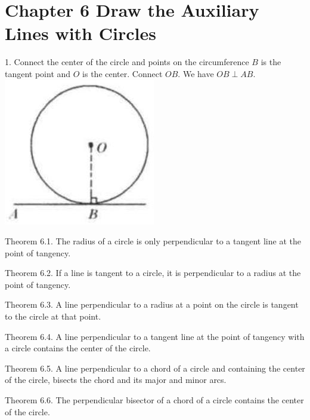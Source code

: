 \documentclass{article}
\begin{document}
\section*{Chapter 6 Draw the Auxiliary Lines with Circles}
1. Connect the center of the circle and points on the circumference
\(B\) is the tangent point and \(O\) is the center. Connect \(O B\). We have \(O B \perp A B\).\\
\centering
\includegraphics[width=\textwidth]{images/146.jpg}

Theorem 6.1. The radius of a circle is only perpendicular to a tangent line at the point of tangency.

Theorem 6.2. If a line is tangent to a circle, it is perpendicular to a radius at the point of tangency.

Theorem 6.3. A line perpendicular to a radius at a point on the circle is tangent to the circle at that point.

Theorem 6.4. A line perpendicular to a tangent line at the point of tangency with a circle contains the center of the circle.

Theorem 6.5. A line perpendicular to a chord of a circle and containing the center of the circle, bisects the chord and its major and minor arcs.

Theorem 6.6. The perpendicular bisector of a chord of a circle contains the center of the circle.
\end{document}
